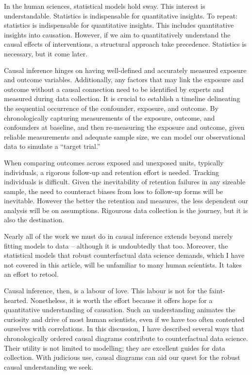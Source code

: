 \documentclass[
  singlecolumn]{article}
\begin{document}
In the human sciences, statistical models hold sway. This interest is
understandable. Statistics is indispensable for quantitative insights.
To repeat: statistics is indispensable for quantitative insights. This
includes quantitative insights into causation. However, if we aim to
quantitatively understand the causal effects of interventions, a
structural approach take precedence. Statistics is necessary, but it
come later.

Causal inference hinges on having well-defined and accurately measured
exposure and outcome variables. Additionally, any factors that may link
the exposure and outcome without a causal connection need to be
identified by experts and measured during data collection. It is crucial
to establish a timeline delineating the sequential occurrence of the
confounder, exposure, and outcome. By chronologically capturing
measurements of the exposure, outcome, and confounders at baseline, and
then re-measuring the exposure and outcome, given reliable measurements
and adequate sample size, we can model our observational data to
simulate a ``target trial.''

When comparing outcomes across exposed and unexposed units, typically
individuals, a rigorous follow-up and retention effort is needed.
Tracking individuals is difficult. Given the inevitability of retention
failures in any sizeable sample, the need to counteract biases from loss
to follow-up forms will be inevitable. However the better the retention
and measures, the less dependent our analysis will be on assumptions.
Rigourous data collection is the journey, but it is also the
destination.

Nearly all of the work we must do in causal inference extends beyond
merely fitting models to data -- although it is undoubtedly that too.
Moreover, the statistical models that robust counterfactual data science
demands, which I have not covered in this article, will be unfamiliar to
many human scientists. It takes an effort to retool.

Causal inference, then, is a labour of love. This labour is not for the
faint-hearted. Nonetheless, it is worth the effort because it offers
hope for a quantitative understanding of causation. Such an
understanding animates the curiosity and drive of most human scientists,
even if we have too often contented ourselves with correlations. In this
discussion, I have described several ways that chronologically ordered
causal diagrams contribute to counterfactual data science. Their utility
is not limited to modelling; they are excellent guides for data
collection. With judicious use, causal diagrams can aid our quest for
the robust causal understanding we seek.
\end{document}
